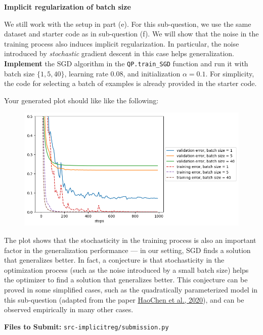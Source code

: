 \item {} \textbf{Implicit regularization of batch size}

We still work with the setup in part (e). For this sub-question, we use the same dataset and starter code as in sub-question (f). We will show that the noise in the training process also induces implicit regularization. In particular, the noise introduced by \emph{stochastic} gradient descent in this case helps generalization. \textbf{Implement} the SGD algorithm in the \texttt{QP.train\_SGD} function and run it with batch size $\{1, 5, 40\}$, learning rate $0.08$, and initialization $\alpha=0.1$. For simplicity, the code for selecting a batch of examples is already provided in the starter code.

Your generated plot should like like the following:

\begin{figure}[H]
    \centering
    \includegraphics[width=.7\linewidth]{04-implicitreg/implicitreg_quadratic_batchsize.png}
\end{figure}

The plot shows that the stochasticity in the training process is also an important factor in the generalization performance --- in our setting, SGD finds a solution that generalizes better. In fact, a conjecture is that stochasticity in the optimization process (such as the noise introduced by a small batch size) helps the optimizer to find a solution that generalizes better. This conjecture can be proved in some simplified cases, such as the quadratically parameterized model in this sub-question (adapted from the paper \href{https://arxiv.org/abs/2006.08680}{HaoChen et al., 2020}), and can be observed empirically in many other cases.

\textbf{Files to Submit: }\texttt{src-implicitreg/submission.py}